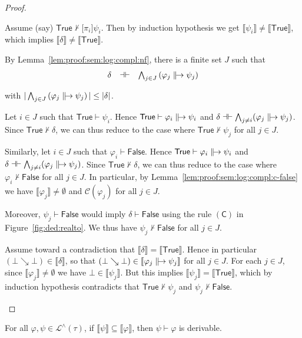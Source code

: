 \documentclass[%
  a4paper,
  UKenglish,
  cleveref,
  autoref,
  thm-restate,
  numberwithinsect,
]{lipics-v2021}
\newcommand\sle\subseteq
\newcommand\thesis{\vdash}
\newcommand\defthesisiff{\dashv\vdash}
\newcommand\thesisiff{\mathrel{\defthesisiff}}
\newcommand\I[1]{\llbracket #1 \rrbracket} %
\newcommand\ax[1]{(\mathsf{#1})}
\newcommand\C{\mathcal{C}}		%
\newcommand\temp[1]{\mathsf{#1}}
\newcommand\True{\temp{True}}
\newcommand\False{\temp{False}}
\newcommand\arrow\to
\newcommand\defrealto{\mathrel\parallel\joinrel\to}
\newcommand\realto{\mathrel{\defrealto}}
\newcommand\PT{\tau}		%
\newcommand\PTbis{\sigma}	%
\newcommand\step{\searrow}
\newcommand\Lang{\mathcal{L}}
\newcommand\form[1]{\lbrack #1 \rbrack}
\begin{document}
\begin{proof}
\begin{description}
Assume (say) $\True \not\thesis \form{\pi_i} \psi_i$.
Then by induction hypothesis we get
$\I{\psi_i} \neq \I\True$,
which implies $\I\delta \neq \I\True$.


\item[Case of $\PTbis \arrow \PT$.]
By Lemma~\ref{lem:proof:sem:log:compl:nf},
there is a finite set $J$ such that
\[
\begin{array}{l l l}
  \delta
& \thesisiff
& \bigwedge_{j \in J} \left(\varphi_j \realto \psi_j\right)
\end{array}
\]

\noindent
with
\(
  |\bigwedge_{j \in J} \left(\varphi_j \realto \psi_j\right)|
  \leq
  |\delta|
\).


Let $i \in J$ such that $\True \thesis \psi_i$.
Hence $\True \thesis \varphi_i \realto \psi_i$
and
$\delta \thesisiff \bigwedge_{j \neq i} (\varphi_j \realto \psi_j)$.
Since $\True \not\thesis \delta$,
we can thus reduce to the case where
$\True \not\thesis \psi_j$ for all $j \in J$.

Similarly, let $i \in J$ such that $\varphi_i \thesis \False$.
Hence $\True \thesis \varphi_i \realto \psi_i$
and
$\delta \thesisiff \bigwedge_{j \neq i} (\varphi_j \realto \psi_j)$.
Since $\True \not\thesis \delta$,
we can thus reduce to the case where
$\varphi_i \not\thesis \False$ for all $j \in J$.
In particular, 
by Lemma~\ref{lem:proof:sem:log:compl:c-false}
we have $\I{\varphi_j} \neq \emptyset$ and $\C(\varphi_j)$
for all $j \in J$.

Moreover, 
$\psi_j \thesis \False$
would imply $\delta \thesis \False$
using the rule $\ax{C}$ in Figure~\ref{fig:ded:realto}.
We thus have $\psi_j \not\thesis \False$ for all $j \in J$.

Assume toward a contradiction that $\I\delta = \I\True$.
Hence in particular $(\bot \step \bot) \in \I\delta$,
so that $(\bot \step \bot) \in \I{\varphi_j \realto \psi_j}$
for all $j \in J$.
For each $j \in J$,
since $\I{\varphi_j} \neq \emptyset$
we have $\bot \in \I{\psi_j}$.
But this implies $\I{\psi_j} = \I\True$,
which by induction hypothesis contradicts that
$\True \not\thesis \psi_j$
and
$\psi_j \not\thesis \False$.
\qedhere
\end{description}
\end{proof}

\begin{lemma}
\label{lem:proof:sem:log:compl:ded}
For all $\varphi,\psi \in \Lang^\land(\PT)$,
if $\I\psi \sle \I\varphi$,
then $\psi \thesis \varphi$ is derivable.
\end{lemma}
\end{document}
